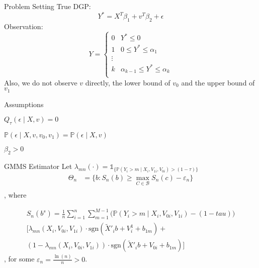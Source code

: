 \documentclass[xcolor=dvipsnames]{beamer}
\begin{document}
\begin{frame}{Problem Setting}
    True DGP:
    \begin{equation}
        Y^{\ast} = X^{T}\beta_{1} + v^{T}\beta_{2} + \epsilon
    \end{equation}
    Observation:
\begin{equation}
    Y = \begin{cases}
        0 & Y^{\ast} \le 0 \\
        1 & 0 \le Y^{\ast} \le \alpha_{1} \\
        \vdots &  \\
        k & \alpha_{k-1} \le Y^{\ast} \le \alpha_{k} \\
    \end{cases}
\end{equation}
Also, we do not observe $v$ directly, the lower bound of $v_{0}$ and the upper bound of $v_{1}$ 
\end{frame}

\begin{frame}{Assumptions}
    \begin{assumption}[1]
        $Q_{\tau}(\epsilon \mid X, v) = 0$
    \end{assumption}
    
    \begin{assumption}[2]
        $\mathbb{P}\left(\epsilon \mid X, v, v_{0}, v_{1}\right) = \mathbb{P}\left(\epsilon \mid X, v\right)$
    \end{assumption}
    
    \begin{assumption}[3]
        $\beta_{2} > 0$
    \end{assumption}
\end{frame}

\begin{frame}{GMMS Estimator}
    Let $\lambda_{mn}(\cdot) = \mathbb{1}_{\{ \mathbb{P}\left( Y_i > m \mid X_i, V_{1 i}, V_{0 i}\right) > (1 - \tau)\}}$
\begin{equation*}
    \begin{aligned}
        \Theta_n &= \{ b: S_{n}(b) \ge \max_{C \in \mathcal{B}} S_{n}(c) - \varepsilon_{n}\}\\
    \end{aligned}
\end{equation*}
, where

\begin{multline*}
    S_n(b^s) = \frac{1}{n} \sum_{i=1}^n \sum_{m=1}^{M-1} \biggl(\mathbb{P}(Y_i > m \mid X_i, V_{0i}, V_{1i}) - (1 - tau)\biggl) \\
    \biggl[ \lambda_{mn}(X_i, V_{0i}, V_{1i}) \cdot \text{sgn}(\tilde{X}'_i b + V^1_i + b_{1m}) + \\
    (1 - \lambda_{mn}(X_i, V_{0i}, V_{1i})) \cdot \text{sgn}(\tilde{X}'_i b + V_{0i} + b_{1m}){\biggl]}
\end{multline*}
    , for some $\varepsilon_{n} = \frac{\ln(n)}{n} > 0$.

\end{frame}
\end{document}
